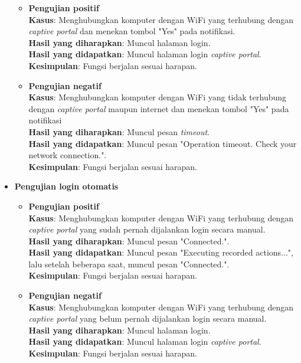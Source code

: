 \begin{itemize}
{        \begin{itemize}
            \item{
                \textbf{Pengujian positif}\\
                \textbf{Kasus}: Menghubungkan komputer dengan WiFi yang terhubung dengan \textit{captive portal} dan menekan tombol "Yes" pada notifikasi.\\
                \textbf{Hasil yang diharapkan}: Muncul halaman login.\\
                \textbf{Hasil yang didapatkan}: Muncul halaman login \textit{captive portal}.\\
                \textbf{Kesimpulan}: Fungsi berjalan sesuai harapan.
            }
            \item{
                \textbf{Pengujian negatif}\\
                \textbf{Kasus}: Menghubungkan komputer dengan WiFi yang tidak terhubung dengan \textit{captive portal} maupun internet dan menekan tombol "Yes" pada notifikasi\\
                \textbf{Hasil yang diharapkan}: Muncul pesan \textit{timeout}.\\
                \textbf{Hasil yang didapatkan}: Muncul pesan "Operation timeout. Check your network connection.".\\
                \textbf{Kesimpulan}: Fungsi berjalan sesuai harapan.
            }
        \end{itemize}
    }
    \item{
        \textbf{Pengujian login otomatis}
        
        \begin{itemize}
            \item{
                \textbf{Pengujian positif}\\
                \textbf{Kasus}: Menghubungkan komputer dengan WiFi yang terhubung dengan \textit{captive portal} yang sudah pernah dijalankan login secara manual.\\
                \textbf{Hasil yang diharapkan}: Muncul pesan "Connected.".\\
                \textbf{Hasil yang didapatkan}: Muncul pesan "Executing recorded actions...", lalu setelah beberapa saat, muncul pesan "Connected.".\\
                \textbf{Kesimpulan}: Fungsi berjalan sesuai harapan.
            }
            \item{
                \textbf{Pengujian negatif}\\
                \textbf{Kasus}: Menghubungkan komputer dengan WiFi yang terhubung dengan \textit{captive portal} yang belum pernah dijalankan login secara manual.\\
                \textbf{Hasil yang diharapkan}: Muncul halaman login.\\
                \textbf{Hasil yang didapatkan}: Muncul halaman login \textit{captive portal}.\\
                \textbf{Kesimpulan}: Fungsi berjalan sesuai harapan.
            }
        \end{itemize}
    }
\end{itemize}



